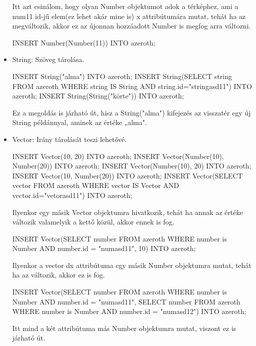 \begin{itemize}
Itt azt csinálom, hogy olyan Number objektumot adok a térképhez, ami a num11 id-jű elem(ez lehet akár mine is) x attribútumára mutat, tehát ha az megváltozik, akkor ez az újonnan hozzáadott Number is megfog arra változni.

\begin{sql}
INSERT Number(Number(11)) INTO azeroth;
\end{sql}

\item String: Szöveg tárolása.

\begin{sql}
INSERT String("alma") INTO azeroth;
INSERT String(SELECT string FROM azeroth WHERE string IS String AND string.id="stringasd11") INTO azeroth;
INSERT String(String("körte")) INTO azeroth;
\end{sql}

Ez a megoldás is járható út, hisz a String("alma") kifejezés az visszatér egy új String példánnyal, aminek az értéke „alma".

\item Vector: Irány tárolását teszi lehetővé.

\begin{sql}
INSERT Vector(10, 20) INTO azeroth;
INSERT Vector(Number(10), Number(20)) INTO azeroth;
INSERT Vector(Number(10), 20) INTO azeroth;
INSERT Vector(10, Number(20)) INTO azeroth;
INSERT Vector(SELECT vector FROM azeroth WHERE vector IS Vector AND vector.id="vetorasd11") INTO azeroth;
\end{sql}

Ilyenkor egy másik Vector objektumra hivatkozik, tehát ha annak az értéke változik valamelyik a kettő közül, akkor ennek is fog.

\begin{sql}
INSERT Vector(SELECT number FROM azeroth WHERE number is Number AND number.id = "numasd11", 10) INTO azeroth;
\end{sql}

Ilyenkor a vector dx attribútuma egy másik Number objektumra mutat, tehát ha az változik, akkor ez is fog.

\begin{sql}
INSERT Vector(SELECT number FROM azeroth WHERE number is Number AND number.id = "numasd11", SELECT number FROM azeroth WHERE number is Number AND number.id = "numasd12") INTO azeroth;
\end{sql}

Itt mind a két attribútuma más Number objektumra mutat, viszont ez is járható út.


\end{itemize}
